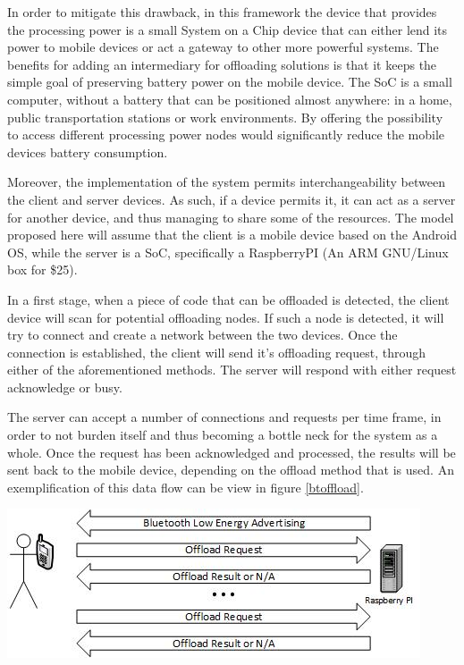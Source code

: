 \documentclass[twoside]{article}
\begin{document}
\begin{multicols}{2}
In order to mitigate this drawback, in this framework the device that provides the processing power is a small System on a Chip device that can either lend its power to mobile devices or act a gateway to other more powerful systems. The benefits for adding an intermediary for offloading solutions is that it keeps the simple goal of preserving battery power on the mobile device. The SoC is a small computer, without a battery that can be positioned almost anywhere: in a home, public transportation stations or work environments. By offering the possibility to access different processing power nodes would significantly reduce the mobile devices battery consumption.

Moreover, the implementation of the system permits interchangeability between the client and server devices. As such, if a device permits it, it can act as a server for another device, and thus managing to share some of the resources. The model proposed here will assume that the client is a mobile device based on the Android OS, while the server is a SoC, specifically a RaspberryPI (An ARM GNU/Linux box for \$25).

In a first stage, when a piece of code that can be offloaded is detected, the client device will scan for potential offloading nodes. If such a node is detected, it will try to connect and create a network between the two devices. Once the connection is established, the client will send it's offloading request, through either of the aforementioned methods. The server will respond with either request acknowledge or busy.

The server can accept a number of connections and requests per time frame, in order to not burden itself and thus becoming a bottle neck for the system as a whole. Once the request has been acknowledged and processed, the results will be sent back to the mobile device, depending on the offload method that is used. An exemplification of this data flow can be view in figure \ref{btoffload}.

\pagebreak

\begingroup
	\centering
	\includegraphics[scale=0.6]{BTOffloadArch.jpg}
	\label{btoffload}
\endgroup


\end{multicols}
\end{document}
